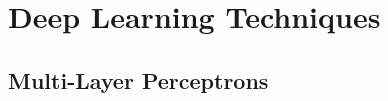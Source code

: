 \chapter{Deep Learning Techniques}
\label{chap:DLTechniques}

\section{Multi-Layer Perceptrons}\label{sec:MLP}

